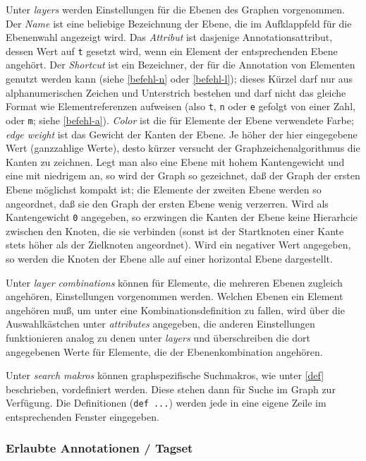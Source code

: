 \documentclass[12pt]{scrartcl}
\begin{document}
Unter \textit{layers} werden Einstellungen für die Ebenen des Graphen vorgenommen. Der \textit{Name} ist eine beliebige Bezeichnung der Ebene, die im Aufklappfeld für die Ebenenwahl angezeigt wird. Das \textit{Attribut} ist dasjenige Annotationsattribut, dessen Wert auf \texttt{t} gesetzt wird, wenn ein Element der entsprechenden Ebene angehört. Der \textit{Shortcut} ist ein Bezeichner, der für die Annotation von Elementen genutzt werden kann (siehe \ref{befehl-n} oder \ref{befehl-l}); dieses Kürzel darf nur aus alphanumerischen Zeichen und Unterstrich bestehen und darf nicht das gleiche Format wie Elementreferenzen aufweisen (also \texttt{t}, \texttt{n} oder \texttt{e} gefolgt von einer Zahl, oder  \texttt{m}; siehe \ref{befehl-a}). \textit{Color} ist die für Elemente der Ebene verwendete Farbe; \textit{edge weight} ist das Gewicht der Kanten der Ebene. Je höher der hier eingegebene Wert (ganzzahlige Werte), desto kürzer versucht der Graphzeichenalgorithmus die Kanten zu zeichnen. Legt man also eine Ebene mit hohem Kantengewicht und eine mit niedrigem an, so wird der Graph so gezeichnet, daß der Graph der ersten Ebene möglichst kompakt ist; die Elemente der zweiten Ebene werden so angeordnet, daß sie den Graph der ersten Ebene wenig verzerren. Wird als Kantengewicht \texttt{0} angegeben, so erzwingen die Kanten der Ebene keine Hierarhcie zwischen den Knoten, die sie verbinden (sonst ist der Startknoten einer Kante stets höher als der Zielknoten angeordnet). Wird ein negativer Wert angegeben, so werden die Knoten der Ebene alle auf einer horizontal Ebene dargestellt.

Unter \textit{layer combinations} können für Elemente, die mehreren Ebenen zugleich angehören, Einstellungen vorgenommen werden. Welchen Ebenen ein Element angehören muß, um unter eine Kombinationsdefinition zu fallen, wird über die Auswahlkästchen unter \textit{attributes} angegeben, die anderen Einstellungen funktionieren analog zu denen unter \textit{layers} und überschreiben die dort angegebenen Werte für Elemente, die der Ebenenkombination angehören.

Unter \textit{search makros} können graphspezifische Suchmakros, wie unter \ref{def} beschrieben, vordefiniert werden. Diese stehen dann für Suche im Graph zur Verfügung. Die Definitionen (\texttt{def ...}) werden jede in eine eigene Zeile im entsprechenden Fenster eingegeben.

\subsubsection{Erlaubte Annotationen / Tagset}\label{erlaubteannotationen}
\end{document}
